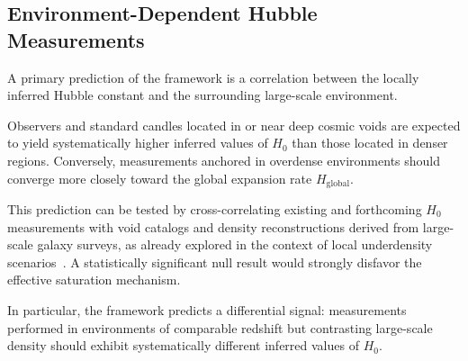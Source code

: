 \subsection{Environment-Dependent Hubble Measurements}
  \label{subsec:h0_environment}

  A primary prediction of the framework is a correlation between the locally inferred
  Hubble constant and the surrounding large-scale environment.

  Observers and standard candles located in or near deep cosmic voids are expected
  to yield systematically higher inferred values of $H_0$ than those located in denser
  regions.
  Conversely, measurements anchored in overdense environments should converge
  more closely toward the global expansion rate $H_{\mathrm{global}}$.

  This prediction can be tested by cross-correlating existing and forthcoming
  $H_0$ measurements with void catalogs and density reconstructions derived from
  large-scale galaxy surveys, as already explored in the context of local
  underdensity scenarios~\cite{Keenan2013KBC,Shanks2019Void,Kennworthy2019VoidCritique}.
  A statistically significant null result would strongly disfavor the effective
  saturation mechanism.

  In particular, the framework predicts a differential signal:
  measurements performed in environments of comparable redshift but contrasting
  large-scale density should exhibit systematically different inferred values of $H_0$.

